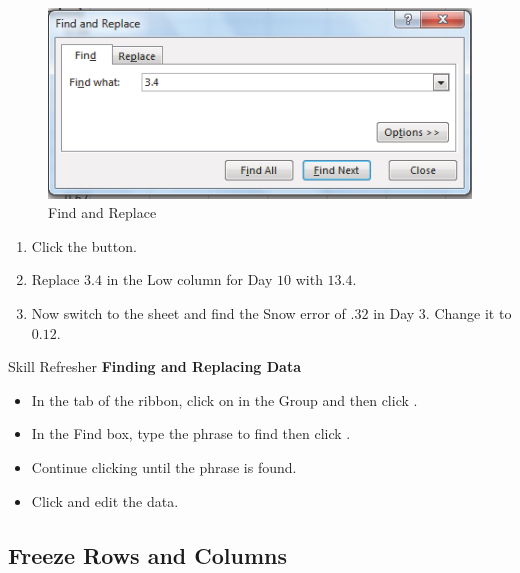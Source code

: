 \begin{figure}[H]
	\centering
	\includegraphics[width=\maxwidth{.95\linewidth}]{gfx/ch05_fig06}
	\caption{Find and Replace}
	\label{05:fig06}
\end{figure}

\begin{enumerate}
	\item Click the  button.
	\item Replace $ 3.4 $ in the Low column for Day $ 10 $ with $ 13.4 $.
	\item Now switch to the  sheet and find the Snow error of $ .32 $ in Day $ 3 $. Change it to $ 0.12 $. 
\end{enumerate}

\begin{center}
	\begin{sklbox}{Skill Refresher}
		\textbf{Finding and Replacing Data}
		\\
		\begin{itemize}
			\setlength{\itemsep}{0pt}
			\setlength{\parskip}{0pt}
			\setlength{\parsep}{0pt}

			\item In the  tab of the ribbon, click on  in the  Group and then click .
			\item In the Find box, type the phrase to find then click .
			\item Continue clicking  until the phrase is found.
			\item Click  and edit the data.
			
		\end{itemize}
	\end{sklbox}
\end{center}

\subsection{Freeze Rows and Columns}

